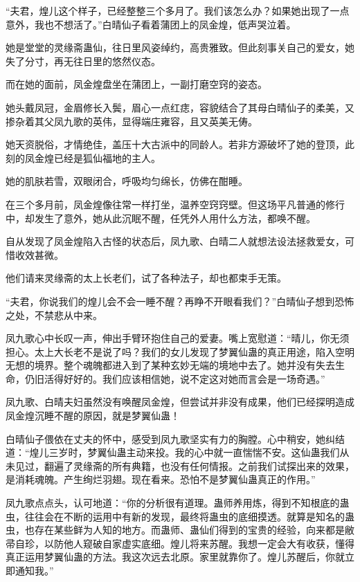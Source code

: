 
\begin{this_body}

“夫君，煌儿这个样子，已经整整三个多月了。我们该怎么办？如果她出现了一点意外，我也不想活了。”白晴仙子看着蒲团上的凤金煌，低声哭泣着。

她是堂堂的灵缘斋蛊仙，往日里风姿绰约，高贵雅致。但此刻事关自己的爱女，她失了分寸，再无往日里的悠然仪态。

而在她的面前，凤金煌盘坐在蒲团上，一副打磨空窍的姿态。

她头戴凤冠，金眉修长入鬓，眉心一点红痣，容貌结合了其母白晴仙子的柔美，又掺杂着其父凤九歌的英伟，显得端庄雍容，且又英美无俦。

她天资脱俗，才情绝佳，盖压十大古派中的同龄人。若非方源破坏了她的登顶，此刻的凤金煌已经是狐仙福地的主人。

她的肌肤若雪，双眼闭合，呼吸均匀绵长，仿佛在酣睡。

在三个多月前，凤金煌像往常一样打坐，温养空窍窍壁。但这场平凡普通的修行中，却发生了意外，她从此沉眠不醒，任凭外人用什么方法，都唤不醒。

自从发现了凤金煌陷入古怪的状态后，凤九歌、白晴二人就想法设法拯救爱女，可惜收效甚微。

他们请来灵缘斋的太上长老们，试了各种法子，却也都束手无策。

“夫君，你说我们的煌儿会不会一睡不醒？再睁不开眼看我们？”白晴仙子想到恐怖之处，不禁悲从中来。

凤九歌心中长叹一声，伸出手臂环抱住自己的爱妻。嘴上宽慰道：“晴儿，你无须担心。太上大长老不是说了吗？我们的女儿发现了梦翼仙蛊的真正用途，陷入空明无想的境界。整个魂魄都进入到了某种玄妙无端的境地中去了。她并没有失去生命，仍旧活得好好的。我们应该相信她，说不定这对她而言会是一场奇遇。”

凤九歌、白晴夫妇虽然没有唤醒凤金煌，但尝试并非没有成果，他们已经探明造成凤金煌沉睡不醒的原因，就是梦翼仙蛊！

白晴仙子偎依在丈夫的怀中，感受到凤九歌坚实有力的胸膛。心中稍安，她纠结道：“煌儿三岁时，梦翼仙蛊主动来投。我的心中就一直惴惴不安。这仙蛊我们从未见过，翻遍了灵缘斋的所有典籍，也没有任何情报。之前我们试探出来的效果，是消耗魂魄。产生绚烂羽翅。现在看来。恐怕不是梦翼仙蛊真正的作用。”

凤九歌点点头，认可地道：“你的分析很有道理。蛊师养用炼，得到不知根底的蛊虫，往往会在不断的运用中有新的发现，最终将蛊虫的底细摸透。就算是知名的蛊虫，也存在某些鲜为人知的地方。而蛊师、蛊仙们得到的宝贵的经验，向来都是敝帚自珍，以防他人窥破自家虚实底细。煌儿将来苏醒。我想一定会大有收获，懂得真正运用梦翼仙蛊的方法。我这次远去北原。家里就靠你了。煌儿苏醒后，你就立即通知我。”


\end{this_body}
